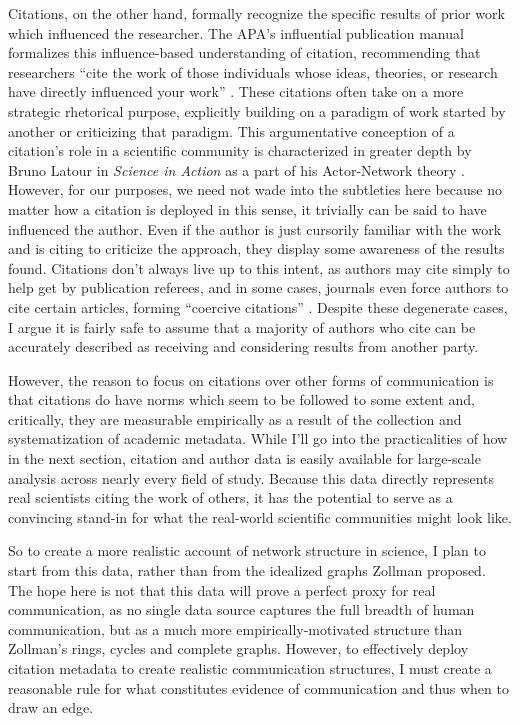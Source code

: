 Citations, on the other hand, formally recognize the specific results of
prior work which influenced the researcher. The APA's influential
publication manual formalizes this influence-based understanding of
citation, recommending that researchers ``cite the work of those
individuals whose ideas, theories, or research have directly influenced
your work'' \autocite{PublicationManualAmerican2010}. These citations
often take on a more strategic rhetorical purpose, explicitly building
on a paradigm of work started by another or criticizing that paradigm.
This argumentative conception of a citation's role in a scientific
community is characterized in greater depth by Bruno Latour in
\emph{Science in Action} as a part of his Actor-Network theory
\autocite{latourLiterature1987a}. However, for our purposes, we need not
wade into the subtleties here because no matter how a citation is
deployed in this sense, it trivially can be said to have influenced the
author. Even if the author is just cursorily familiar with the work and
is citing to criticize the approach, they display some awareness of the
results found. Citations don't always live up to this intent, as authors
may cite simply to help get by publication referees, and in some cases,
journals even force authors to cite certain articles, forming ``coercive
citations'' \autocite{wilhiteCoerciveCitationAcademic2012}. Despite
these degenerate cases, I argue it is fairly safe to assume that a
majority of authors who cite can be accurately described as receiving
and considering results from another party.

However, the reason to focus on citations over other forms of
communication is that citations do have norms which seem to be followed
to some extent and, critically, they are measurable empirically as a
result of the collection and systematization of academic metadata. While
I'll go into the practicalities of how in the next section, citation and
author data is easily available for large-scale analysis across nearly
every field of study. Because this data directly represents real
scientists citing the work of others, it has the potential to serve as a
convincing stand-in for what the real-world scientific communities might
look like.

So to create a more realistic account of network structure in science, I
plan to start from this data, rather than from the idealized graphs
Zollman proposed. The hope here is not that this data will prove a
perfect proxy for real communication, as no single data source captures
the full breadth of human communication, but as a much more
empirically-motivated structure than Zollman's rings, cycles and
complete graphs. However, to effectively deploy citation metadata to
create realistic communication structures, I must create a reasonable
rule for what constitutes evidence of communication and thus when to
draw an edge.

